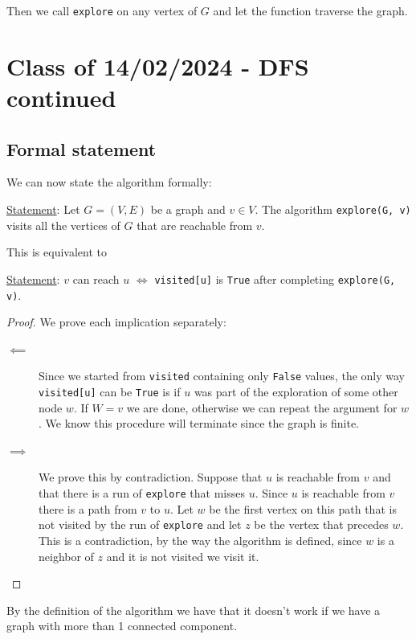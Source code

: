 \documentclass[10pt]{extarticle}
\begin{document}
Then we call \texttt{explore} on any vertex of $G$ and let the function traverse the graph.

\section{Class of 14/02/2024 - DFS continued}

\subsection{Formal statement}

We can now state the algorithm formally:

\underline{Statement}: Let $G = (V, E)$ be a graph and $v \in V$.
The algorithm \texttt{explore(G, v)} visits all the vertices of $G$ that are reachable from $v$.

This is equivalent to

\underline{Statement}: $v$ can reach $u$ $\iff$ \texttt{visited[u]} is \texttt{True} after completing \texttt{explore(G, v)}.

\begin{proof}
    We prove each implication separately:

    \begin{description}
        \item[$\impliedby$] Since we started from \texttt{visited} containing only \texttt{False} values,
            the only way \texttt{visited[u]} can be \texttt{True} is if $u$ was part of the exploration of some other node $w$.
            If $W = v$ we are done, otherwise we can repeat the argument for $w$.
            We know this procedure will terminate since the graph is finite.
        \item[$\implies$] We prove this by contradiction.
            Suppose that $u$ is reachable from $v$ and that there is a run of \texttt{explore} that misses $u$.
            Since $u$ is reachable from $v$ there is a path from $v$ to $u$.
            Let $w$ be the first vertex on this path that is not visited by the run of \texttt{explore} and let $z$ be the vertex that precedes $w$.
            This is a contradiction, by the way the algorithm is defined, since $w$ is a neighbor of $z$ and it is not visited we visit it.
    \end{description}
\end{proof}

By the definition of the algorithm we have that it doesn't work if we have a graph with more than 1 connected component.
\end{document}
